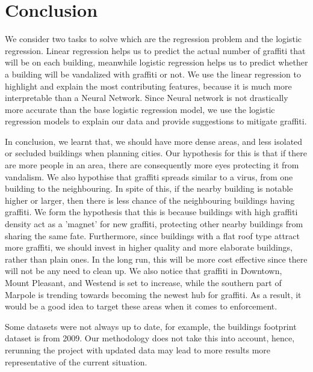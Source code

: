 \chapter{Conclusion}

We consider two tasks to solve which are the regression problem and the logistic regression. Linear regression helps us to predict the actual number of graffiti that will be on each building, meanwhile logistic regression helps us to predict whether a building will be vandalized with graffiti or not. We use the linear regression to highlight and explain the most contributing features, because it is much more interpretable than a Neural Network. Since Neural network is not drastically more accurate than the base logistic regression model, we use the logistic regression models to explain our data and provide suggestions to mitigate graffiti.

In conclusion, we learnt that, we should have more dense areas, and less isolated or secluded buildings when planning cities. Our hypothesis for this is that if there are more people in an area, there are consequently more eyes protecting it from vandalism. We also hypothise that graffiti spreads similar to a virus, from one building to the neighbouring. In spite of this, if the nearby building is notable higher or larger, then there is less chance of the neighbouring buildings having graffiti. We form the hypothesis that this is because buildings with high graffiti density act as a 'magnet' for new graffiti, protecting other nearby buildings from sharing the same fate. Furthermore, since buildings with a flat roof type attract more graffiti, we should invest in higher quality and more elaborate buildings, rather than plain ones. In the long run, this will be more cost effective since there will not be any need to clean up. We also notice that graffiti in Downtown, Mount Pleasant, and Westend is set to increase, while the southern part of Marpole is trending towards becoming  the newest hub for graffiti. As a result, it would be a good idea to target these areas when it comes to enforcement.

Some datasets were not always up to date, for example, the buildings footprint dataset is from 2009. Our methodology does not take this into account, hence, rerunning the project with updated data may lead to more results more representative of the current situation.

